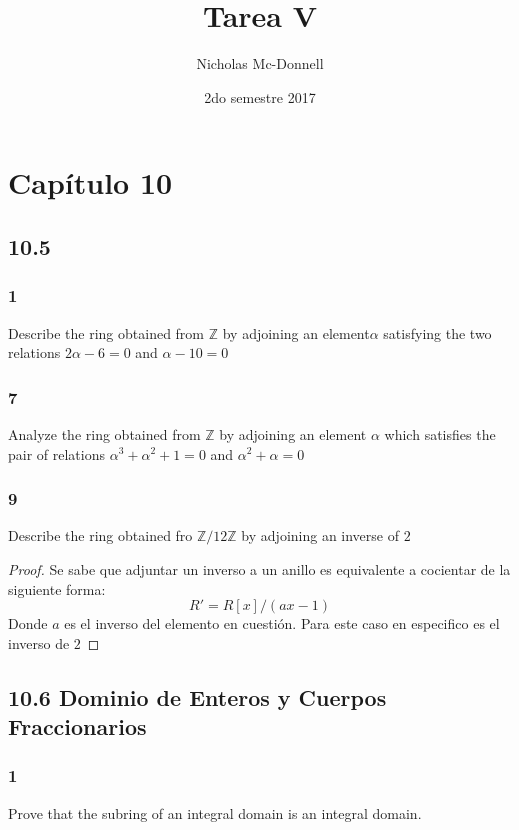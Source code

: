 \documentclass[11pt]{article}
\title{Tarea V}
\author{Nicholas Mc-Donnell}
\date{2do semestre 2017}
\newcommand{\set}[1]{\mathbb{#1}}
\theoremstyle{definition}
\begin{document}
        \maketitle
        \newpage

        \tableofcontents
        \newpage
        \section{Capítulo 10}
        \subsection{10.5}
        \subsubsection{1}
        Describe the ring obtained from $\set{Z}$ by adjoining an element$\alpha$ satisfying the two relations $2\alpha-6=0$ and $\alpha-10=0$

        \subsubsection{7}
        Analyze the ring obtained from $\set{Z}$ by adjoining an element $\alpha$ which satisfies the pair of relations $\alpha^3+\alpha^2+1=0$ and $\alpha^2+\alpha=0$

        \subsubsection{9}
        Describe the ring obtained fro $\set{Z}/12\set{Z}$ by adjoining an inverse of $2$
        \begin{proof}
            Se sabe que adjuntar un inverso a un anillo es equivalente a cocientar de la siguiente forma:
            \[R'=R[x]/(ax-1)\]
            Donde $a$ es el inverso del elemento en cuestión. Para este caso en especifico es el inverso de $2$
        \end{proof}

        \subsection{10.6 Dominio de Enteros y Cuerpos Fraccionarios}
        \subsubsection{1}
        Prove that the subring of an integral domain is an integral domain.
\end{document}
